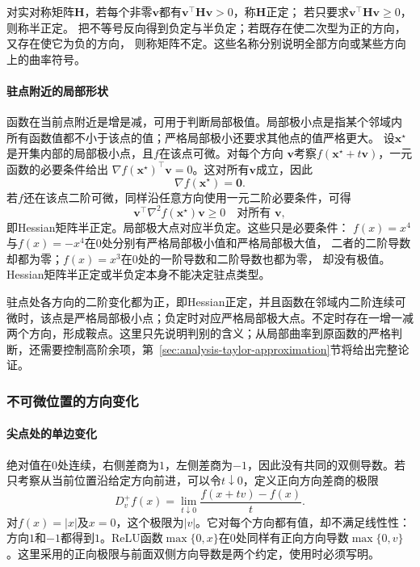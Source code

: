 对实对称矩阵$\bm H$，若每个非零$\bm v$都有$\bm v^\top\bm H\bm v>0$，称$\bm H$正定；
若只要求$\bm v^\top\bm H\bm v\geq0$，则称半正定。
把不等号反向得到负定与半负定；若既存在使二次型为正的方向，又存在使它为负的方向，
则称矩阵不定。这些名称分别说明全部方向或某些方向上的曲率符号。

\paragraph{驻点附近的局部形状}

函数在当前点附近是增是减，可用于判断局部极值。局部极小点是指某个邻域内
所有函数值都不小于该点的值；严格局部极小还要求其他点的值严格更大。
设$\bm{x}^{\star}$是开集内部的局部极小点，且$f$在该点可微。对每个方向 $\bm{v}$考察$f(\bm{x}^{\star}+t\bm{v})$，一元函数的必要条件给出 $\nabla f(\bm{x}^{\star})^{\top}\bm{v}=0$。这对所有$\bm{v}$成立，因此
\begin{equation}
  \nabla f(\bm{x}^{\star})=\bm{0}.
\label{eq:analysis-first-order-necessary}
\end{equation}
若$f$还在该点二阶可微，同样沿任意方向使用一元二阶必要条件，可得
\begin{equation}
  \bm{v}^{\top}\nabla^2f(\bm{x}^{\star})\bm{v}\geq0
  \quad\text{对所有 }\bm{v},
\label{eq:analysis-second-order-necessary}
\end{equation}
即Hessian矩阵半正定。局部极大点对应半负定。这些只是必要条件：
$f(x)=x^4$与$f(x)=-x^4$在$0$处分别有严格局部极小值和严格局部极大值，
二者的二阶导数却都为零；$f(x)=x^3$在$0$处的一阶导数和二阶导数也都为零，
却没有极值。Hessian矩阵半正定或半负定本身不能决定驻点类型。

驻点处各方向的二阶变化都为正，即Hessian正定，并且函数在邻域内二阶连续可微时，该点是严格局部极小点；负定时对应严格局部极大点。不定时存在一增一减两个方向，形成鞍点。这里只先说明判别的含义；从局部曲率到原函数的严格判断，还需要控制高阶余项，第~\ref{sec:analysis-taylor-approximation}节将给出完整论证。

\subsubsection{不可微位置的方向变化}
\label{sec:analysis-directional-nonsmooth}

\paragraph{尖点处的单边变化}

绝对值在$0$处连续，右侧差商为$1$，左侧差商为$-1$，因此没有共同的双侧导数。若只考察从当前位置沿给定方向前进，可以令$t\downarrow0$，定义正向方向差商的极限
\[
 D^+_v f(x)=\lim_{t\downarrow0}\frac{f(x+tv)-f(x)}{t}.
\]
对$f(x)=|x|$及$x=0$，这个极限为$|v|$。它对每个方向都有值，却不满足线性性：方向$1$和$-1$都得到$1$。ReLU函数$\max\{0,x\}$在$0$处同样有正向方向导数$\max\{0,v\}$。这里采用的正向极限与前面双侧方向导数是两个约定，使用时必须写明。


